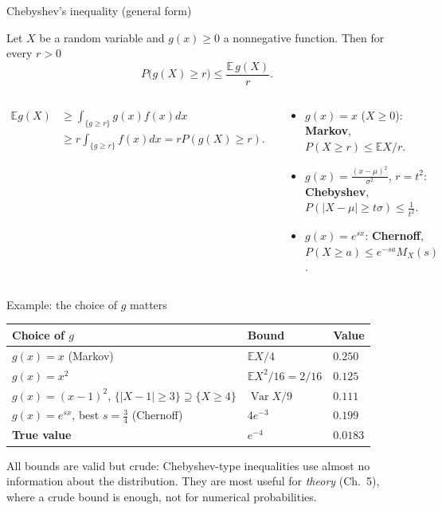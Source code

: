 \documentclass[aspectratio=169,t,10pt]{beamer}
\newcommand{\E}{\mathbb{E}}
\newcommand{\Var}{\operatorname{Var}}
\begin{document}
\begin{frame}{Chebyshev's inequality (general form)}
  \begin{tcolorbox}[mythm={Theorem (CB 3.6.1)}]\small
  Let $X$ be a random variable and $g(x)\ge0$ a nonnegative function. Then for every $r>0$
  \[P\bigl(g(X)\ge r\bigr)\le\frac{\E\,g(X)}{r}.\]
  \end{tcolorbox}
  \begin{columns}[T]
  \begin{tcolorbox}[mynote={Proof (continuous)}]\small
  \begin{align*}\E g(X)&\ge\int_{\{g\ge r\}}g(x)f(x)dx\\&\ge r\!\int_{\{g\ge r\}}\!f(x)dx=rP(g(X)\ge r).\end{align*}
  \end{tcolorbox}
  \begin{tcolorbox}[mydef={Special cases}]\small
  \begin{itemize}
    \item $g(x)=x$ ($X\ge0$): \textbf{Markov}, $P(X\ge r)\le\E X/r$.
    \item $g(x)=\frac{(x-\mu)^2}{\sigma^2}$, $r=t^2$: \textbf{Chebyshev}, $P(|X-\mu|\ge t\sigma)\le\frac1{t^2}$.
    \item $g(x)=e^{sx}$: \textbf{Chernoff}, $P(X\ge a)\le e^{-sa}M_X(s)$.
  \end{itemize}
  \end{tcolorbox}
  \end{columns}
\end{frame}

\begin{frame}{Example: the choice of $g$ matters}
  \begin{tcolorbox}[myex={$X\sim\mathrm{Exponential}(1)$: bound $P(X\ge4)$}]\small
  \renewcommand{\arraystretch}{1.45}
  \begin{center}
  \begin{tabular}{@{}lll@{}}
  \textbf{Choice of $g$}&\textbf{Bound}&\textbf{Value}\\\hline
  $g(x)=x$ (Markov)&$\E X/4$&$0.250$\\
  $g(x)=x^2$&$\E X^2/16=2/16$&$0.125$\\
  $g(x)=(x-1)^2$, $\{|X-1|\ge3\}\supseteq\{X\ge4\}$&$\Var X/9$&$0.111$\\
  $g(x)=e^{sx}$, best $s=\frac34$ (Chernoff)&$4e^{-3}$&$0.199$\\\hline
  \textbf{True value}&$e^{-4}$&$\mathbf{0.0183}$
  \end{tabular}
  \end{center}
  \end{tcolorbox}
  \begin{tcolorbox}[mynote={Lessons}]\small
  All bounds are valid but crude: Chebyshev-type inequalities use almost no information about the distribution. They are most useful for \emph{theory} (Ch.~5), where a crude bound is enough, not for numerical probabilities.
  \end{tcolorbox}
\end{frame}
\end{document}
